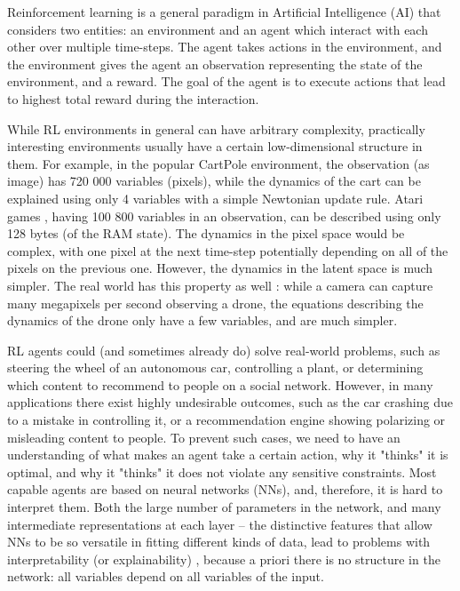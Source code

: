 \documentclass[a4paper,11pt,oneside]{report}
\begin{document}
Reinforcement learning is a general paradigm in Artificial Intelligence (AI) that considers two entities: an environment and an agent which interact with each other over multiple time-steps. The agent takes actions in the environment, and the environment gives the agent an observation representing the state of the environment, and a reward. The goal of the agent is to execute actions that lead to highest total reward during the interaction.

While RL environments in general can have arbitrary complexity, practically interesting environments usually have a certain low-dimensional structure in them. For example, in the popular CartPole environment, the observation (as image) has 720 000 variables (pixels), while the dynamics of the cart can be explained using only 4 variables with a simple Newtonian update rule. Atari games \cite{brockman2016openai}, having 100 800 variables in an observation, can be described using only 128 bytes (of the RAM state). The dynamics in the pixel space would be complex, with one pixel at the next time-step potentially depending on all of the pixels on the previous one. However, the dynamics in the latent space is much simpler. The real world has this property as well \cite{Hamming1980}: while a camera can capture many megapixels per second observing a drone, the equations describing the dynamics of the drone only have a few variables, and are much simpler.


RL agents could (and sometimes already do) solve real-world problems, such as steering the wheel of an autonomous car, controlling a plant, or determining which content to recommend to people on a social network. However, in many applications there exist highly undesirable outcomes, such as the car crashing due to a mistake in controlling it, or a recommendation engine showing polarizing or misleading content to people. To prevent such cases, we need to have an understanding of what makes an agent take a certain action, why it "thinks" it is optimal, and why it "thinks" it does not violate any sensitive constraints. Most capable agents are based on neural networks (NNs), and, therefore, it is hard to interpret them. Both the large number of parameters in the network, and many intermediate representations at each layer -- the distinctive features that allow NNs to be so versatile in fitting different kinds of data, lead to problems with interpretability (or explainability) \cite{Lipton}, because a priori there is no structure in the network: all variables depend on all variables of the input.
\end{document}
